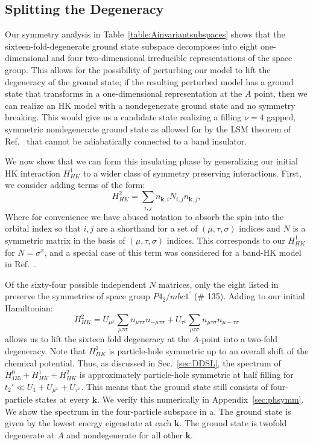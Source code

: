 \documentclass[prb,aps,amssymb,twocolumn,notitlepage]{revtex4-2}
\begin{document}
\subsection{Splitting the Degeneracy}\label{subsec:splitting}
Our symmetry analysis in Table~\ref{table:Ainvariantsubspaces} shows that the sixteen-fold-degenerate ground state subspace decomposes into eight one-dimensional and four two-dimensional irreducible representations of the space group. 
This allows for the possibility of perturbing our model to lift the degeneracy of the ground state; if the resulting perturbed model has a ground state that transforms in a one-dimensional representation at the $A$ point, then we can realize an HK model with a nondegenerate ground state and no symmetry breaking. 
This would give us a candidate state realizing a filling $\nu=4$ gapped, symmetric nondegenerate ground state as allowed for by the LSM theorem of Ref.~\cite{watanabe2015filling} that cannot be adiabatically connected to a band insulator.

We now show that we can form this insulating phase by generalizing our initial HK interaction $H^{1}_{HK}$ to a wider class of symmetry preserving interactions. 
First, we consider adding terms of the form:
\begin{equation}\label{eq:hkNterms}
H^{2}_{HK}=\sum_{i,j}n_{\mathbf{k},i}N_{i,j} n_{\mathbf{k},j},
\end{equation}
Where for convenience we have abused notation to absorb the spin into the orbital index so that $i,j$ are a shorthand for a set of $(\mu,\tau,\sigma)$ indices and $N$ is a symmetric matrix in the basis of $(\mu,\tau,\sigma)$ indices. This corresponds to our $H^{1}_{HK}$ for $N=\sigma^x$, and a special case of this term was considered for a band-HK model in Ref.~\cite{yanghk2019}.


Of the sixty-four possible independent $N$ matrices, only the eight listed in  preserve the symmetries of space group $P4_2/mbc1^\prime$ (\# 135). 
Adding to our initial Hamiltonian:
\begin{equation}\label{eq:hhk2135}
H^{2}_{HK}=U_{\mu^x}\sum_{\mu\tau\sigma}n_{\mu\tau\sigma}n_{-\mu\tau\sigma}+
    U_{\tau^x}\sum_{\mu\tau\sigma}n_{\mu\tau\sigma}n_{\mu-\tau\sigma}
\end{equation}
allows us to lift the sixteen fold degeneracy at the $A$-point into a two-fold degeneracy. 
Note that $H_{HK}^{2}$ is particle-hole symmetric up to an overall shift of the chemical potential. 
 Thus, as discussed in Sec.~\ref{sec:DDSL}, the spectrum of $H_{135}^{0}+H_{HK}^{1}+H_{HK}^{2}$ is approximately particle-hole symmetric at half filling for $t_2'\ll U_1+U_{\mu^x}+U_{\tau^x}$. 
 This means that the ground state still consists of four-particle states at every $\mathbf{k}$. 
 We verify this numerically in Appendix~\ref{sec:phsymm}. 
 We show the spectrum in the four-particle subspace in a. 
 The ground state is given by the lowest energy eigenstate at each $\mathbf{k}$. 
 The ground state is twofold degenerate at $A$ and nondegenerate for all other $\mathbf{k}$.
 
\end{document}
